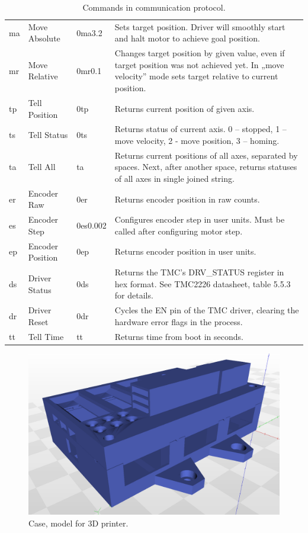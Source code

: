 \documentclass[10pt,article]{article}
\begin{document}
\begin{table}[ht]
\begin{tabularx}{\textwidth}{lllX}
\rowcolor[gray]{0.90} ma & Move Absolute & 0ma3.2 & Sets target position. Driver will smoothly start and halt motor to achieve goal position. \\
\rowcolor[gray]{0.95} mr & Move Relative & 0mr0.1 & Changes target position by given value, even if target position was not achieved yet. In „move velocity” mode sets target relative to current position. \\
\rowcolor[gray]{0.90} tp & Tell Position & 0tp & Returns current position of given axis. \\
\rowcolor[gray]{0.95} ts & Tell Status & 0ts & Returns status of current axis. 0 – stopped, 1 – move velocity, 2 - move position, 3 – homing. \\
\rowcolor[gray]{0.90} ta & Tell All & ta & Returns current positions of all axes, separated by spaces. Next, after another space, returns statuses of all axes in single joined string.\\
\rowcolor[gray]{0.95} er & Encoder Raw & 0er & Returns encoder position in raw counts.\\
\rowcolor[gray]{0.90} es & Encoder Step & 0es0.002 & Configures encoder step in user units. Must be called after configuring motor step.\\
\rowcolor[gray]{0.95} ep & Encoder Position & 0ep & Returns encoder position in user units. \\
\rowcolor[gray]{0.90} ds & Driver Status & 0ds & Returns the TMC's DRV_STATUS register in hex format. See TMC2226 datasheet, table 5.5.3 for details. \\
\rowcolor[gray]{0.95} dr & Driver Reset & 0dr & Cycles the EN pin of the TMC driver, clearing the hardware error flags in the process. \\
\rowcolor[gray]{0.90} tt & Tell Time & tt & Returns time from boot in seconds. \\
\end{tabularx}
\caption{Commands in communication protocol.}\label{commands}
\end{table}

\begin{figure}[H]
 \centering
 \includegraphics[width = 15cm]{case.png}
\caption {Case, model for 3D printer.} \label{case}
\end{figure}
\end{document}
